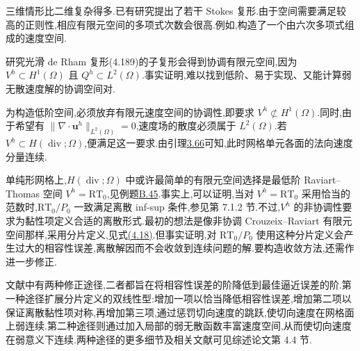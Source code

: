 \begin{note}[三维情形]\label{note:stokes-three-dimensional-complex}
三维情形比二维复杂得多.已有研究提出了若干 Stokes 复形.由于空间需要满足较高的正则性,相应有限元空间的多项式次数会很高.例如,\textcite{Neilan2015}构造了一个由六次多项式组成的速度空间.
\end{note}

\begin{note}\label{note:stokes-hdiv-weakly-divergence-free}
研究光滑 de Rham 复形(4.189)的子复形会得到协调有限元空间,因为 $V^h\subset H^1(\Omega)$ 且 $Q^h\subset L^2(\Omega)$.事实证明,难以找到低阶、易于实现、又能计算弱无散速度解的协调空间对.

为构造低阶空间,必须放弃有限元速度空间的协调性,即要求 $V^h\not\subset H^1(\Omega)$.同时,由于希望有 $\|\nabla\cdot\bm{u}^h\|_{L^2(\Omega)}=0$,速度场的散度必须属于 $L^2(\Omega)$.若 $V^h\subset H(\operatorname{div};\Omega)$,便满足这一要求.由引理\hyperref[lem:piecewise-polynomial-hdiv]{3.66}可知,此时网格单元各面的法向速度分量连续.

单纯形网格上,$H(\operatorname{div};\Omega)$ 中或许最简单的有限元空间选择是最低阶 Raviart--Thomas 空间 $V^h=\mathrm{RT}_0$,见例题\hyperref[ex:appendix-b-45]{B.45}.事实上,可以证明,当对 $V^h=\mathrm{RT}_0$ 采用恰当的范数时,$\mathrm{RT}_0/P_0$ 一致满足离散 inf-sup 条件,参见\textcite{Boffi2013}第 7.1.2 节.不过,$V^h$ 的非协调性要求为黏性项定义合适的离散形式.最初的想法是像非协调 Crouzeix--Raviart 有限元空间那样,采用分片定义,见式\hyperref[eq:stokes-fem-bilinear-forms]{(4.18)}.但事实证明,对 $\mathrm{RT}_0/P_0$ 使用这种分片定义会产生过大的相容性误差,离散解因而不会收敛到连续问题的解.要构造收敛方法,还需作进一步修正.

文献中有两种修正途径,二者都旨在将相容性误差的阶降低到最佳逼近误差的阶.第一种途径扩展分片定义的双线性型:增加一项以恰当降低相容性误差,增加第二项以保证离散黏性项对称,再增加第三项,通过惩罚切向速度的跳跃,使切向速度在网格面上弱连续.第二种途径则通过加入局部的弱无散函数丰富速度空间,从而使切向速度在弱意义下连续.两种途径的更多细节及相关文献可见综述论文\textcite{JohnLinkeMerdonNeilanRebholz2016}第 4.4 节.
\end{note}

